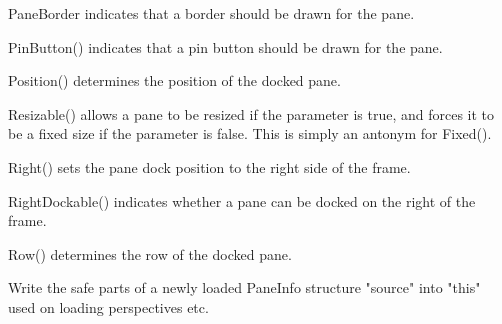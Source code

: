 PaneBorder indicates that a border should be drawn for the pane.

\label{wxauipaneinfopinbutton}


PinButton() indicates that a pin button should be drawn for the pane.

\label{wxauipaneinfoposition}


Position() determines the position of the docked pane.

\label{wxauipaneinforesizable}


Resizable() allows a pane to be resized if the parameter is true, and forces it to be a fixed size if the parameter is false.  This is simply an antonym for Fixed().

\label{wxauipaneinforight}


Right() sets the pane dock position to the right side of the frame.

\label{wxauipaneinforightdockable}


RightDockable() indicates whether a pane can be docked on the right of the frame.

\label{wxauipaneinforow}


Row() determines the row of the docked pane.

\label{wxauipaneinfosafeset}


Write the safe parts of a newly loaded PaneInfo structure "source" into "this"
used on loading perspectives etc.

\label{wxauipaneinfosetflag}


